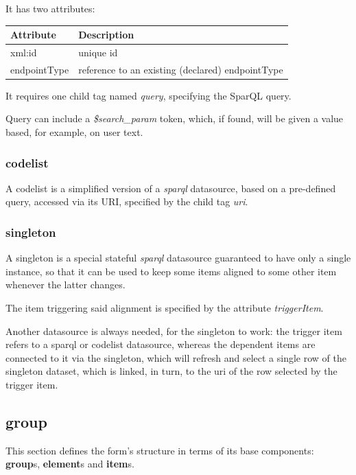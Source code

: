 \documentclass[10pt]{article}
\begin{document}
	It has two attributes:
	\begin{center}
		\begin{tabular}{ | p{} | p{} | }
			\hline
			Attribute & Description \\ 
			\hline
			xml:id & unique id \\  
			\hline
			endpointType & reference to an existing (declared) endpointType \\
			\hline
		\end{tabular}
	\end{center}

	It requires one child tag named \textit{query}, specifying the SparQL query.
	
	Query can include a \textit{\$search\_param} token, which, if found, will be given a value based, for example, on user text.
	
	\subsubsection{codelist}
	A codelist is a simplified version of a \textit{sparql} datasource, based on a pre-defined query, accessed via its URI, specified by the child tag \textit{uri}.
	
	\subsubsection{singleton}
	\label{singleton}
	A singleton is a special stateful \textit{sparql} datasource guaranteed to have only a single instance, so that it can be used to keep some items aligned to some other item whenever the latter changes.
	
	The item triggering said alignment is specified by the attribute \textit{triggerItem}.
	
	Another datasource is always needed, for the singleton to work: the trigger item refers to a sparql or codelist datasource, whereas the dependent items are connected to it via the singleton, which will refresh and select a single row of the singleton dataset, which is linked, in turn, to the uri of the row selected by the trigger item.
	
	
	\subsection{group}
	This section defines the form's structure in terms of its base components: \textbf{group}s, \textbf{element}s and \textbf{item}s.
	
\end{document}
